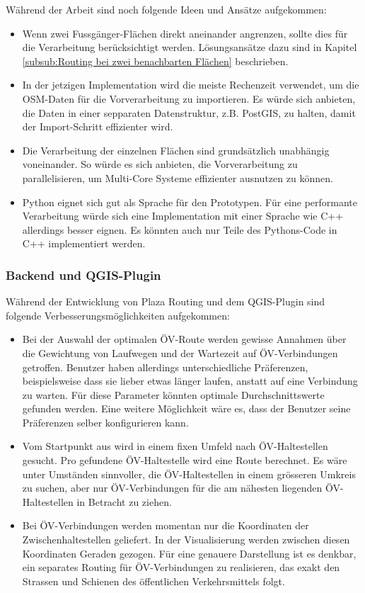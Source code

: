Während der Arbeit sind noch folgende Ideen und Ansätze aufgekommen:

\begin{itemize}
    \item Wenn zwei Fussgänger-Flächen direkt aneinander angrenzen, sollte dies für die Verarbeitung berücksichtigt werden. Lösungsansätze dazu sind in Kapitel \ref{subsub:Routing bei zwei benachbarten Flächen} beschrieben.
    \item In der jetzigen Implementation wird die meiste Rechenzeit verwendet, um die \ac{OSM}-Daten für die Vorverarbeitung zu importieren. Es würde sich anbieten, die Daten in einer sepparaten Datenstruktur, z.B. PostGIS, zu halten, damit der Import-Schritt effizienter wird.
    \item Die Verarbeitung der einzelnen Flächen sind grundsätzlich unabhängig voneinander. So würde es sich anbieten, die Vorverarbeitung zu parallelisieren, um Multi-Core Systeme effizienter ausnutzen zu können.
    \item Python eignet sich gut als Sprache für den Prototypen. Für eine performante Verarbeitung würde sich eine Implementation mit einer Sprache wie C++ allerdings besser eignen. Es könnten auch nur Teile des Pythons-Code in C++ implementiert werden.
\end{itemize}

\subsubsection{Backend und QGIS-Plugin}
\label{subsub:Weiterentwicklung_Backend_QGIS}

Während der Entwicklung von Plaza Routing und dem QGIS-Plugin sind folgende Verbesserungsmöglichkeiten aufgekommen:

\begin{itemize}
    \item Bei der Auswahl der optimalen ÖV-Route werden gewisse Annahmen über die Gewichtung von Laufwegen und der Wartezeit auf ÖV-Verbindungen getroffen. Benutzer haben allerdings unterschiedliche Präferenzen, beispielsweise dass sie lieber etwas länger laufen, anstatt auf eine Verbindung zu warten. Für diese Parameter könnten optimale Durchschnittswerte gefunden werden. Eine weitere Möglichkeit wäre es, dass der Benutzer seine Präferenzen selber konfigurieren kann.
    \item Vom Startpunkt aus wird in einem fixen Umfeld nach ÖV-Haltestellen gesucht. Pro gefundene ÖV-Haltestelle wird eine Route berechnet. Es wäre unter Umständen sinnvoller, die ÖV-Haltestellen in einem grösseren Umkreis zu suchen, aber nur ÖV-Verbindungen für die am nähesten liegenden ÖV-Haltestellen in Betracht zu ziehen.
    \item Bei ÖV-Verbindungen werden momentan nur die Koordinaten der Zwischenhaltestellen geliefert. In der Visualisierung werden zwischen diesen Koordinaten Geraden gezogen. Für eine genauere Darstellung ist es denkbar, ein separates Routing für ÖV-Verbindungen zu realisieren, das exakt den Strassen und Schienen des öffentlichen Verkehrsmittels folgt.
\end{itemize}